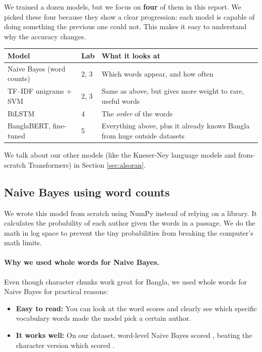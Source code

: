 We trained a dozen models, but we focus on \textbf{four} of them in this report. We picked these four because they show a clear progression: each model is capable of doing something the previous one could not. This makes it easy to understand why the accuracy changes.

\begin{center}\small
\begin{tabular}{llp{6.1cm}}
\toprule
\textbf{Model} & \textbf{Lab} & \textbf{What it looks at} \\
\midrule
Naive Bayes (word counts)      & 2, 3 & Which words appear, and how often \\
TF--IDF unigrams + SVM   & 2, 3 & Same as above, but gives more weight to rare, useful words \\
BiLSTM                      & 4    & The \emph{order} of the words \\
BanglaBERT, fine-tuned      & 5    & Everything above, plus it already knows Bangla from huge outside datasets \\
\bottomrule
\end{tabular}
\end{center}

We talk about our other models (like the Kneser-Ney language models and from-scratch Transformers) in Section \ref{sec:alsoran}.

\subsection{Naive Bayes using word counts}

We wrote this model from scratch using NumPy instead of relying on a library. It calculates the probability of each author given the words in a passage. We do the math in log space to prevent the tiny probabilities from breaking the computer's math limits.

\paragraph{Why we used whole words for Naive Bayes.}
Even though character chunks work great for Bangla, we used whole words for Naive Bayes for practical reasons:
\begin{itemize}
  \item \textbf{Easy to read:} You can look at the word scores and clearly see which specific vocabulary words made the model pick a certain author.
  \item \textbf{It works well:} On our dataset, word-level Naive Bayes scored \naiveBayesAcc{}, beating the character version which scored \naiveBayesCharAcc{}.
\end{itemize}

